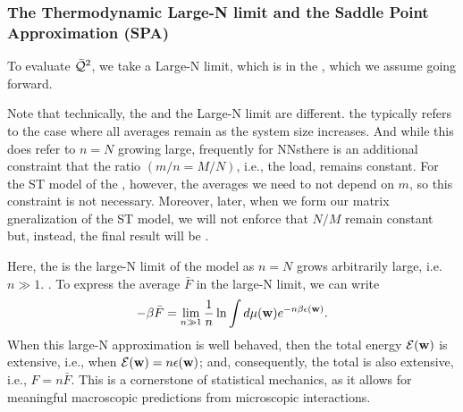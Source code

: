 \subsubsection{The Thermodynamic Large-N limit and the Saddle Point Approximation (SPA)}
\label{sxn:largeN_and_SPA}
To evaluate $\bar{\mathcal{Q}}^{2}$, we take a Large-N limit, which is 
in the \ThermodynamicLimit, which we assume going forward.

Note that technically,  the \ThermodynamicLimit and the Large-N limit are different.
the \ThermodynamicLimit typically refers to the case where all \Thermodynamic averages
remain \SizeIntensive as the system size increases.
And while this does refer to $n=N$ growing large, frequently for NNsthere is an additional
constraint that the ratio $(m/n = M/N)$, i.e., the load, remains constant.\cite{SST92,MM17_TR_v1}
For the ST model of the \Perceptron, however, the \Thermodynamic averages we need to not depend on $m$,
so this constraint is not necessary.
Moreover, later, when we form our matrix gneralization of the ST model, we will not
enforce that $N/M$ remain constant but, instead, the final result will be \SizeConsistent.

Here, the \ThermodynamicLimit is the large-N limit of the model as $n=N$
grows arbitrarily large, i.e. $n \gg 1$.
.
To express the average \FreeEnergy $\bar{F}$ in the large-N limit, we can write
\begin{align}
  -\beta\bar{F} = \lim_{n\gg 1}\frac{1}{n}\ln \int d\mu({\mathbf{w}}) e^{-n\beta\epsilon({\mathbf{w}})}  .
\end{align}
When this large-N approximation is well behaved,
then the total energy $\mathcal{E}(\mathbf{w})$ is extensive, i.e., when $\mathcal{E}(\mathbf{w})=n\epsilon({\mathbf{w}})$;
and, consequently, the total \FreeEnergy is also extensive, i.e., $F=n\bar{F}$.
This is a cornerstone of statistical mechanics,
as it allows for meaningful macroscopic predictions from microscopic interactions.

\paragraph{\SelfAveraging}

